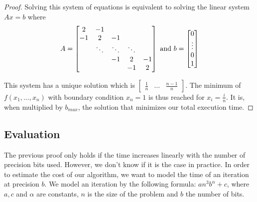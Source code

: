 \documentclass[a4paper,10pt]{article}
\begin{document}
\begin{proof}
  
  Solving this system of equations is equivalent to solving the linear system $Ax=b$ where
  \[ A = \begin{bmatrix}
    2       & -1 &  &  &  \\
    -1       & 2 & -1 &  &  \\
    & \ddots & \ddots & \ddots & \\
    & & -1 & 2 & -1 \\
           &  &  & -1 & 2
\end{bmatrix} \textup{ and } b = \begin{bmatrix} 0 \\ \vdots \\ 0 \\ 1 \end{bmatrix} \]
   
   This system has a unique solution which is $\begin{bmatrix} \frac{1}{n} & \dots & \frac{n-1}{n} \end{bmatrix}$.
   The minimum of $f(x_1,\dots,x_n)$ with boundary condition $x_n=1$ is thus reached for $x_i = \frac{i}{n}$.
   It is, when multiplied by $b_{max}$, the solution that minimizes our total execution time.
   \end{proof}
   
   \subsection{Evaluation}
   
   The previous proof only holds if the time increases linearly with the number of precision bits used. However, we don't know if it is the case in practice.
   In order to estimate the cost of our algorithm, we want to model the time of an iteration at precision $b$. We model an iteration by the following formula: $an^3b^\alpha+c$, where $a,c$ and $\alpha$ are constants,
   $n$ is the size of the problem and $b$ the number of bits.
   
\end{document}

